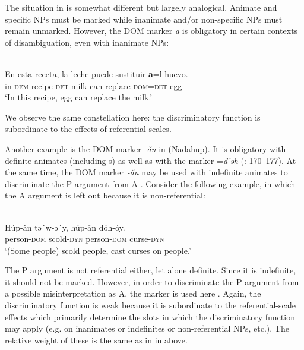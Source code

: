 \documentclass[output=paper]{langsci/langscibook}
\begin{document}
The situation in  is somewhat different but largely analogical. Animate and specific NPs must be marked while inanimate and/or non-specific NPs must remain unmarked. However, the DOM marker \textit{a} is obligatory in certain contexts of disambiguation, even with inanimate NPs:

\ea\label{ex:serzant:16}
\\
\gll En esta receta, la   leche   puede   sustituir \textbf{a}=l     huevo.\\
     in  \textsc{dem} recipe \textsc{det}   milk   can   replace \textsc{dom=det}   egg\\
\glt ‘In this recipe, egg can replace the milk.’
\z

\noindent We observe the same constellation here: the discriminatory function is subordinate to the effects of referential scales. 

Another example is the DOM marker \textit{{}-ǎn} in  (Nadahup). It is obligatory with definite animates (including s) as well as with the   marker =\textit{d’ǝh} (\citealt{Epps2008}: 170–177). At the same time, the DOM marker \textit{{}-ǎn} may be used with indefinite animates to discriminate the P argument from A \citep[95]{Epps2009_DOM}. Consider the following example, in which the A argument is left out because it is non-referential: 

\ea\label{ex:serzant:17}
\\
\gll Húp-ǎn   tǝ´w-ǝ´y,   húp-ǎn    dóh-óy.\\
     person-\textsc{dom}  scold-\textsc{dyn}  person-\textsc{dom}  curse-\textsc{dyn}\\
\glt ‘(Some people) scold people, cast curses on people.’
\z

The P argument is not referential either, let alone definite. Since it is indefinite, it should not be marked. However, in order to discriminate the P argument from a possible misinterpretation as A, the  marker is used here \citep[95]{Epps2009_DOM}. Again, the discriminatory function is weak because it is subordinate to the referential-scale effects which primarily determine the slots in which the discriminatory function may apply (e.g. on inanimates or indefinites or non-referential NPs, etc.). The relative weight of these is the same as in  in  above. 
\end{document}
